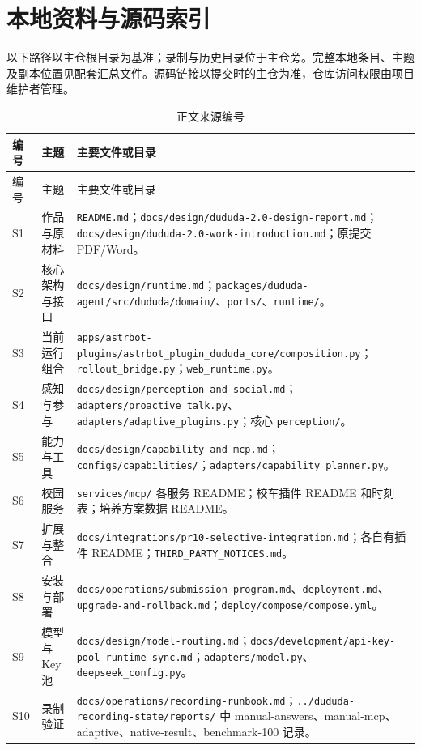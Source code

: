 \section{本地资料与源码索引}
以下路径以主仓根目录为基准；录制与历史目录位于主仓旁。完整本地条目、主题及副本位置见配套汇总文件。源码链接以提交时的主仓为准，仓库访问权限由项目维护者管理。

\begingroup\small\renewcommand{\arraystretch}{1.15}
\begin{longtable}{@{}L{9mm}L{44mm}L{96mm}@{}}
\caption{正文来源编号}\\\toprule
编号 & 主题 & 主要文件或目录\\\midrule\endfirsthead
\toprule 编号 & 主题 & 主要文件或目录\\\midrule\endhead
S1 & 作品与原材料 & \nolinkurl{README.md}；\nolinkurl{docs/design/dududa-2.0-design-report.md}；\nolinkurl{docs/design/dududa-2.0-work-introduction.md}；原提交 PDF/Word。\\
S2 & 核心架构与接口 & \nolinkurl{docs/design/runtime.md}；\nolinkurl{packages/dududa-agent/src/dududa/domain/}、\nolinkurl{ports/}、\nolinkurl{runtime/}。\\
S3 & 当前运行组合 & \nolinkurl{apps/astrbot-plugins/astrbot_plugin_dududa_core/composition.py}；\nolinkurl{rollout_bridge.py}；\nolinkurl{web_runtime.py}。\\
S4 & 感知与参与 & \nolinkurl{docs/design/perception-and-social.md}；\nolinkurl{adapters/proactive_talk.py}、\nolinkurl{adapters/adaptive_plugins.py}；核心 \nolinkurl{perception/}。\\
S5 & 能力与工具 & \nolinkurl{docs/design/capability-and-mcp.md}；\nolinkurl{configs/capabilities/}；\nolinkurl{adapters/capability_planner.py}。\\
S6 & 校园服务 & \nolinkurl{services/mcp/} 各服务 README；校车插件 README 和时刻表；培养方案数据 README。\\
S7 & 扩展与整合 & \nolinkurl{docs/integrations/pr10-selective-integration.md}；各自有插件 README；\nolinkurl{THIRD_PARTY_NOTICES.md}。\\
S8 & 安装与部署 & \nolinkurl{docs/operations/submission-program.md}、\nolinkurl{deployment.md}、\nolinkurl{upgrade-and-rollback.md}；\nolinkurl{deploy/compose/compose.yml}。\\
S9 & 模型与 Key 池 & \nolinkurl{docs/design/model-routing.md}；\nolinkurl{docs/development/api-key-pool-runtime-sync.md}；\nolinkurl{adapters/model.py}、\nolinkurl{deepseek_config.py}。\\
S10 & 录制验证 & \nolinkurl{docs/operations/recording-runbook.md}；\nolinkurl{../dududa-recording-state/reports/} 中 manual-answers、manual-mcp、adaptive、native-result、benchmark-100 记录。\\

\end{longtable}
